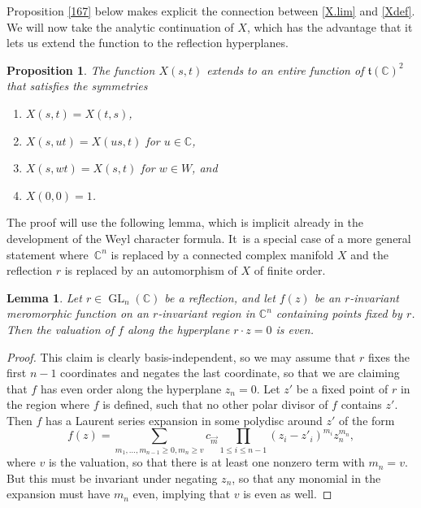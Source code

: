 \documentclass[10pt]{amsart}
\newenvironment{enumeratea}
{\bgroup\def\theenumi{\alph{enumi}}\def\theenumii{\roman{enumii}}\begin{enumerate}}
{\end{enumerate}\egroup}
\newtheorem{lem}[equation]{Lemma}
\newtheorem{prop}[equation]{Proposition}
\theoremstyle{definition}
\newcommand{\mft}{\mathfrak{t}}
\newcommand{\C}{\mathbb{C}}
\DeclareMathOperator{\GL}{GL}
\numberwithin{equation}{section}
\begin{document}
Proposition \ref{167} below makes explicit the connection between \eqref{X.lim} and \eqref{Xdef}.
We will now take the analytic continuation of $X$,
which has the
advantage that it lets us extend the
function to the reflection hyperplanes.

\begin{prop} \label{Xprop}
The function $X(s,t)$ extends to an entire function of $\mft(\C)^2$
that satisfies the symmetries
\begin{enumeratea}
\item $X(s,t)=X(t,s)$,
\item $X(s,ut)=X(us,t)$ for $u\in \C$,
\item $X(s,wt)=X(s,t)$ for $w\in W$, and
\item $X(0,0)=1$.
\end{enumeratea}
\end{prop}

The proof will use the following lemma, which is implicit already in the development of the Weyl character formula. It~is a special case of a more general statement where~$\C^n$ is replaced by a connected complex manifold $X$ and the reflection $r$ is replaced by an automorphism of $X$ of finite order.

\begin{lem} \label{value}
Let $r\in \GL_n(\C)$ be a reflection, and let $f(z)$ be an $r$-invariant meromorphic function on an $r$-invariant region in $\C^n$
containing points fixed by $r$. Then the valuation of $f$ along the hyperplane $r\cdot z=0$ is even.
\end{lem}

\begin{proof}
This claim is clearly basis-independent, so we may assume that $r$ fixes the first $n-1$ coordinates and negates the last coordinate, so that we are claiming that $f$ has even order along the hyperplane $z_n=0$.
Let $z'$ be a fixed point of $r$ in the region where $f$ is defined, such that no other polar divisor of $f$ contains $z'$. Then $f$ has a Laurent series expansion in some polydisc around $z'$ of the form
\[
f(z) = \sum_{m_1,\dots,m_{n-1}\ge 0,m_n\ge v} c_{\vec{m}} \prod_{1\le i\le n-1} (z_i-z'_i)^{m_i} z_n^{m_n},
\]
where $v$ is the valuation, so that there is at least one nonzero term with $m_n=v$. But this must be invariant under negating $z_n$, so that any monomial in the expansion must have $m_n$ even, implying that $v$ is even as well.
\end{proof}
\end{document}
